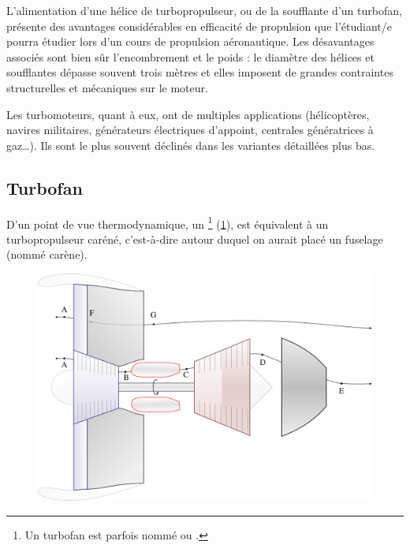 		L’alimentation d’une hélice de turbopropulseur, ou de la soufflante d’un turbofan, présente des avantages considérables en efficacité de propulsion que l’étudiant/e pourra étudier lors d’un cours de propulsion aéronautique. Les désavantages associés sont bien sûr l’encombrement et le poids : le diamètre des hélices et soufflantes dépasse souvent trois mètres et elles imposent de grandes contraintes structurelles et mécaniques sur le moteur.

		Les turbomoteurs, quant à eux, ont de multiples applications (hélicoptères, navires militaires, générateurs électriques d’appoint, centrales génératrices à gaz…). Ils sont le plus souvent déclinés dans les variantes détaillées plus bas.

	\dontbreakpage

	\subsection{Turbofan}

		D’un point de vue thermodynamique, un \footnote{Un turbofan est parfois nommé  ou .} (\cref{fig_turbofan}), est équivalent à un turbopropulseur caréné, c’est-à-dire autour duquel on aurait placé un fuselage (nommé carène).
		
		\begin{figure}
			\begin{center}
				\includegraphics[scale=0.6]{images/circuit_turbofan.png}
			\end{center}
			\label{fig_turbofan}
		\end{figure}
		
